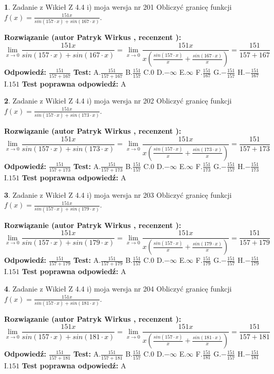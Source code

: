 \documentclass[12pt, a4paper]{article}
\theoremstyle{definition} %
\newtheorem{zad}{}
\newcommand{\zadStart}[1]{\begin{zad}#1\newline}
\newcommand{\zadStop}{\end{zad}}
\newcommand{\rozwStart}[2]{\noindent \textbf{Rozwiązanie (autor #1 , recenzent #2): }\newline}
\newcommand{\rozwStop}{\newline}
\newcommand{\odpStart}{\noindent \textbf{Odpowiedź:}\newline}
\newcommand{\odpStop}{\newline}
\newcommand{\testStart}{\noindent \textbf{Test:}\newline}
\newcommand{\testStop}{\newline}
\newcommand{\kluczStart}{\noindent \textbf{Test poprawna odpowiedź:}\newline}
\newcommand{\kluczStop}{\newline}
\begin{document}
\zadStart{Zadanie z Wikieł Z 4.4 i) moja wersja nr 201}
Obliczyć granicę funkcji $f(x)=\frac{151x}{sin(157\cdot x) +sin(167\cdot x)}$.
\zadStop
\rozwStart{Patryk Wirkus}{}
$$\lim\limits_{x\to 0}\frac{151x}{sin(157\cdot x) +sin(167\cdot x)}=\lim\limits_{x\to 0}\frac{151x}{x(\frac{sin(157\cdot x)}{x}+\frac{sin(167\cdot x)}{x})}=\frac{151}{157+167}$$
\rozwStop
\odpStart
$\frac{151}{157+167}$
\odpStop
\testStart
A.$\frac{151}{157+167}$
B.$\frac{151}{157}$
C.$0$
D.$-\infty$
E.$\infty$
F.$\frac{151}{167}$
G.$-\frac{151}{157}$
H.$-\frac{151}{167}$
I.$151$
\testStop
\kluczStart
A
\kluczStop



\zadStart{Zadanie z Wikieł Z 4.4 i) moja wersja nr 202}
Obliczyć granicę funkcji $f(x)=\frac{151x}{sin(157\cdot x) +sin(173\cdot x)}$.
\zadStop
\rozwStart{Patryk Wirkus}{}
$$\lim\limits_{x\to 0}\frac{151x}{sin(157\cdot x) +sin(173\cdot x)}=\lim\limits_{x\to 0}\frac{151x}{x(\frac{sin(157\cdot x)}{x}+\frac{sin(173\cdot x)}{x})}=\frac{151}{157+173}$$
\rozwStop
\odpStart
$\frac{151}{157+173}$
\odpStop
\testStart
A.$\frac{151}{157+173}$
B.$\frac{151}{157}$
C.$0$
D.$-\infty$
E.$\infty$
F.$\frac{151}{173}$
G.$-\frac{151}{157}$
H.$-\frac{151}{173}$
I.$151$
\testStop
\kluczStart
A
\kluczStop



\zadStart{Zadanie z Wikieł Z 4.4 i) moja wersja nr 203}
Obliczyć granicę funkcji $f(x)=\frac{151x}{sin(157\cdot x) +sin(179\cdot x)}$.
\zadStop
\rozwStart{Patryk Wirkus}{}
$$\lim\limits_{x\to 0}\frac{151x}{sin(157\cdot x) +sin(179\cdot x)}=\lim\limits_{x\to 0}\frac{151x}{x(\frac{sin(157\cdot x)}{x}+\frac{sin(179\cdot x)}{x})}=\frac{151}{157+179}$$
\rozwStop
\odpStart
$\frac{151}{157+179}$
\odpStop
\testStart
A.$\frac{151}{157+179}$
B.$\frac{151}{157}$
C.$0$
D.$-\infty$
E.$\infty$
F.$\frac{151}{179}$
G.$-\frac{151}{157}$
H.$-\frac{151}{179}$
I.$151$
\testStop
\kluczStart
A
\kluczStop



\zadStart{Zadanie z Wikieł Z 4.4 i) moja wersja nr 204}
Obliczyć granicę funkcji $f(x)=\frac{151x}{sin(157\cdot x) +sin(181\cdot x)}$.
\zadStop
\rozwStart{Patryk Wirkus}{}
$$\lim\limits_{x\to 0}\frac{151x}{sin(157\cdot x) +sin(181\cdot x)}=\lim\limits_{x\to 0}\frac{151x}{x(\frac{sin(157\cdot x)}{x}+\frac{sin(181\cdot x)}{x})}=\frac{151}{157+181}$$
\rozwStop
\odpStart
$\frac{151}{157+181}$
\odpStop
\testStart
A.$\frac{151}{157+181}$
B.$\frac{151}{157}$
C.$0$
D.$-\infty$
E.$\infty$
F.$\frac{151}{181}$
G.$-\frac{151}{157}$
H.$-\frac{151}{181}$
I.$151$
\testStop
\kluczStart
A
\kluczStop
\end{document}
